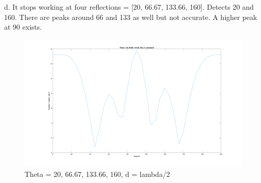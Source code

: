 \documentclass[a4paper]{article}
\begin{document}
d. It stops working at four reflections = [20, 66.67, 133.66, 160]. Detects 20 and 160. There are peaks around 66 and 133 as well but not accurate. A higher peak at 90 exists. 

\begin{figure}[H]
\centering
\includegraphics[width=\textwidth]{d.png}
\caption{Theta = 20, 66.67, 133.66, 160, d = lambda/2}
\end{figure}




 








 
\end{document}

